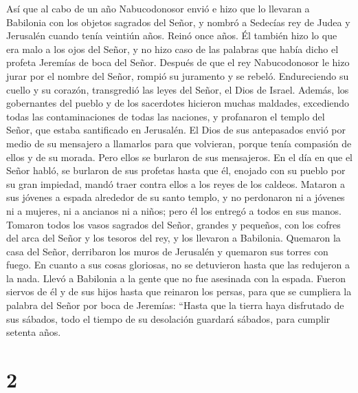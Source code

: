  Así que al cabo de un año Nabucodonosor envió e hizo que
lo llevaran a Babilonia con los objetos sagrados del Señor,
 y nombró a Sedecías rey de Judea y Jerusalén cuando
tenía veintiún años. Reinó once años.  Él también hizo lo
que era malo a los ojos del Señor, y no hizo caso de las palabras que
había dicho el profeta Jeremías de boca del Señor. 
Después de que el rey Nabucodonosor le hizo jurar por el nombre del
Señor, rompió su juramento y se rebeló. Endureciendo su cuello y su
corazón, transgredió las leyes del Señor, el Dios de Israel.
 Además, los gobernantes del pueblo y de los sacerdotes
hicieron muchas maldades, excediendo todas las contaminaciones de todas
las naciones, y profanaron el templo del Señor, que estaba santificado
en Jerusalén.  El Dios de sus antepasados envió por medio
de su mensajero a llamarlos para que volvieran, porque tenía compasión
de ellos y de su morada.  Pero ellos se burlaron de sus
mensajeros. En el día en que el Señor habló, se burlaron de sus profetas
 hasta que él, enojado con su pueblo por su gran
impiedad, mandó traer contra ellos a los reyes de los caldeos.
 Mataron a sus jóvenes a espada alrededor de su santo
templo, y no perdonaron ni a jóvenes ni a mujeres, ni a ancianos ni a
niños; pero él los entregó a todos en sus manos.  Tomaron
todos los vasos sagrados del Señor, grandes y pequeños, con los cofres
del arca del Señor y los tesoros del rey, y los llevaron a Babilonia.
 Quemaron la casa del Señor, derribaron los muros de
Jerusalén y quemaron sus torres con fuego.  En cuanto a
sus cosas gloriosas, no se detuvieron hasta que las redujeron a la nada.
Llevó a Babilonia a la gente que no fue asesinada con la espada.
 Fueron siervos de él y de sus hijos hasta que reinaron
los persas, para que se cumpliera la palabra del Señor por boca de
Jeremías:  ``Hasta que la tierra haya disfrutado de sus
sábados, todo el tiempo de su desolación guardará sábados, para cumplir
setenta años.

\hypertarget{section-1}{%
\section{2}\label{section-1}}

